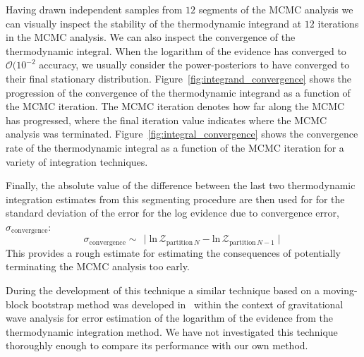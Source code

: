 Having drawn independent samples from $12$ segments of the MCMC analysis we can visually inspect the stability of the thermodynamic integrand at $12$ iterations in the MCMC analysis. We can also inspect the convergence of the thermodynamic integral. When the logarithm of the evidence has converged to $\mathcal{O}(10^{-2}$ accuracy, we usually consider the power-posteriors to have converged to their final stationary distribution. Figure~\ref{fig:integrand_convergence} shows the progression of the convergence of the thermodynamic integrand as a function of the MCMC iteration. The MCMC iteration denotes how far along the MCMC has progressed, where the final iteration value indicates where the MCMC analysis was terminated. Figure~\ref{fig:integral_convergence} shows the convergence rate of the thermodynamic integral as a function of the MCMC iteration for a variety of integration techniques.

Finally, the absolute value of the difference between the last two thermodynamic integration estimates from this segmenting procedure are then used for for the standard deviation of the error for the log evidence due to convergence error, $\sigma_{\mathrm{convergence}}$:
\begin{equation}
    \sigma_{\mathrm{convergence}} \sim  \, \mid \mathrm{ln} \, \mathcal{Z}_{\mathrm{partition \,} N} - \mathrm{ln} \, \mathcal{Z}_{\mathrm{partition \,} N-1} \mid
\end{equation}
This provides a rough estimate for estimating the consequences of potentially terminating the MCMC analysis too early.

During the development of this technique a similar technique based on a moving-block bootstrap method was developed in~\cite{Russel:2018pqv} within the context of gravitational wave analysis for error estimation of the logarithm of the evidence from the thermodynamic integration method. We have not investigated this technique thoroughly enough to compare its performance with our own method.

